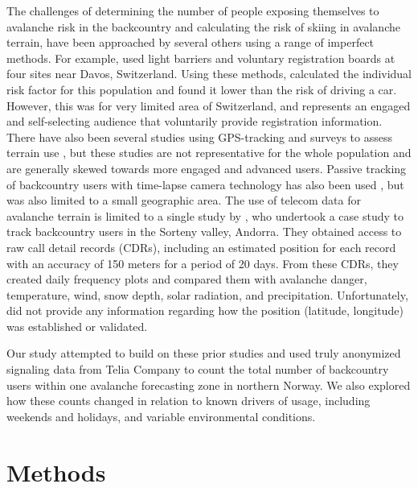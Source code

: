 \documentclass[authordate,empirical]{jote-new-article}
\begin{document}
The challenges of determining the number of people exposing themselves to avalanche risk in the backcountry and calculating the risk of skiing in avalanche terrain, have been approached by several others using a range of imperfect methods. For example, \textcite{Zweifel2006} used light barriers and voluntary registration boards at four sites near Davos, Switzerland. Using these methods, \textcite{Zweifel2006} calculated the individual risk factor for this population and found it lower than the risk of driving a car. However, this was for very limited area of Switzerland, and represents an engaged and self-selecting audience that voluntarily provide registration information. There have also been several studies using GPS-tracking and surveys to assess terrain use \parencites{Buhler2016}{Hendrikx2014}{Hendrikx2016}{Sykes2020}{Thumlert2017}{Winkler2021}, but these studies are not representative for the whole population and are generally skewed towards more engaged and advanced users. Passive tracking of backcountry users with time-lapse camera technology has also been used \parencites{Saly2020}, but was also limited to a small geographic area. The use of telecom data for avalanche terrain is limited to a single study by \textcite{Francisco2018}, who undertook a case study to track backcountry users in the Sorteny valley, Andorra. They obtained access to raw call detail records (CDRs), including an estimated position for each record with an accuracy of 150 meters for a period of 20 days. From these CDRs, they created daily frequency plots and compared them with avalanche danger, temperature, wind, snow depth, solar radiation, and precipitation. Unfortunately, \textcite{Francisco2018} did not provide any information regarding how the position (latitude, longitude) was established or validated.



Our study attempted to build on these prior studies and used truly anonymized signaling data from Telia Company to count the total number of backcountry users within one avalanche forecasting zone in northern Norway. We also explored how these counts changed in relation to known drivers of usage, including weekends and holidays, and variable environmental conditions.







\section{Methods}
\end{document}
